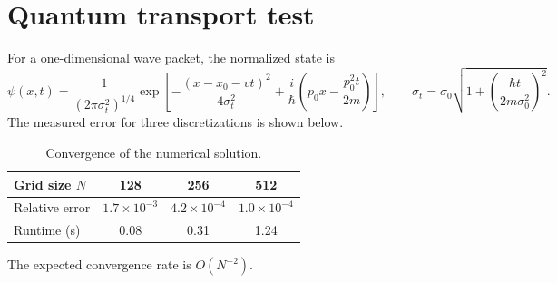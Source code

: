 \documentclass[11pt]{article}
\begin{document}
\section*{Quantum transport test}
For a one-dimensional wave packet, the normalized state is
\[
\psi(x,t)=\frac{1}{(2\pi\sigma_t^2)^{1/4}}
\exp\!\left[-\frac{(x-x_0-vt)^2}{4\sigma_t^2}
        +\frac{i}{\hbar}\left(p_0x-\frac{p_0^2t}{2m}\right)\right],
\qquad
\sigma_t=\sigma_0\sqrt{1+\left(\frac{\hbar t}{2m\sigma_0^2}\right)^2}.
\]
The measured error for three discretizations is shown below.
\begin{table}[h]
\centering
\begin{tabular}{lccc}
\toprule
Grid size $N$ & 128 & 256 & 512\\
\midrule
Relative error & $1.7\times10^{-3}$ & $4.2\times10^{-4}$ & $1.0\times10^{-4}$\\
Runtime (s) & 0.08 & 0.31 & 1.24\\
\bottomrule
\end{tabular}
\caption{Convergence of the numerical solution.}
\end{table}
The expected convergence rate is $O(N^{-2})$.
\end{document}

